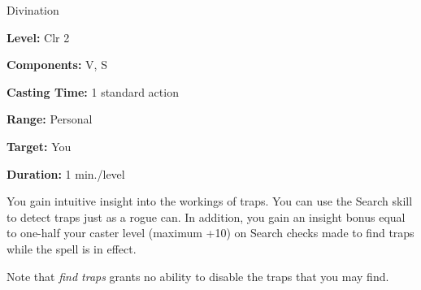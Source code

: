 
Divination

\textbf{Level:} Clr 2

\textbf{Components:} V, S

\textbf{Casting Time:} 1 standard action

\textbf{Range:} Personal

\textbf{Target:} You

\textbf{Duration:} 1 min./level

You gain intuitive insight into the workings of traps. You can use the Search skill 
to detect traps just as a rogue can. In addition, you gain an insight bonus equal 
to one-half your caster level (maximum +10) on Search checks made to find traps 
while the spell is in effect.

Note that \textit{find traps} grants no ability to disable the traps that you may 
find.

